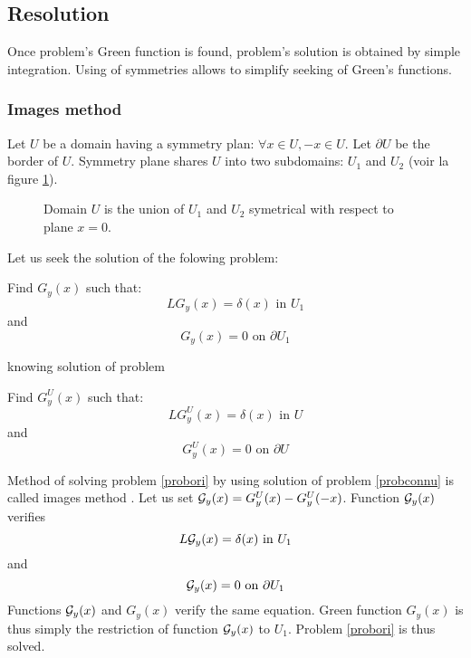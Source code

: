 \documentclass[12pt]{book}
\begin{document}
\subsection{Resolution}\label{secresolinv}
Once problem's Green function is found, problem's solution is obtained by
simple integration. Using of symmetries allows to simplify seeking of Green's
functions. 

\subsubsection{Images method}\label{secimage}
Let  $U$ be a domain having a symmetry plan: $\forall x
\in U, -x\in U$. Let $\partial U$ be the border of $U$.
Symmetry plane shares $U$ into two subdomains: $U_1$ and
$U_2$ (voir la figure \ref{figsymet}).
\begin{figure}[htb]
 \centerline{}   
 \caption{Domain $U$ is the union of $U_1$ and  $U_2$
symetrical with respect to plane $x=0$.}
 \label{figsymet}
\end{figure}
Let us seek the solution of the folowing problem:
\begin{prob}\label{probori} 
Find $G_y(x)$ such that:
\begin{equation}
LG_y(x)=\delta(x) \mbox{ in } U_1
\end{equation}
and
\begin{equation}
 G_y(x)=0 \mbox{  on  } \partial U_1
\end{equation}
\end{prob}
knowing solution of problem
\begin{prob}\label{probconnu}
Find $G^U_y(x)$ such that:
\begin{equation}
LG^U_y(x)=\delta(x) \mbox{  in  } U
\end{equation}
and
\begin{equation}
 G^U_y(x)=0 \mbox{  on  } \partial U
\end{equation}
\end{prob}
Method of solving problem \ref{probori} by using solution of problem
\ref{probconnu} is called images method \cite{ma:equad:Dautray1}.
Let us set ${\cal G}_y(x)={G}^U_y(x)-{G}^U_y(-x)$. Function ${\cal
G}_y(x)$ verifies
\begin{equation}
L{\cal G}_y(x)=\delta(x) \mbox{ in } U_1
\end{equation}
and
\begin{equation}
{\cal G}_y(x)=0 \mbox{  on  } \partial U_1
\end{equation}
Functions ${\cal G}_y(x)$ and $G_y(x)$ verify the same equation. Green
function $G_y(x)$ is thus simply the
restriction of function ${\cal G}_y(x)$ to $U_1$.
Problem \ref{probori} is thus solved.
\end{document}
